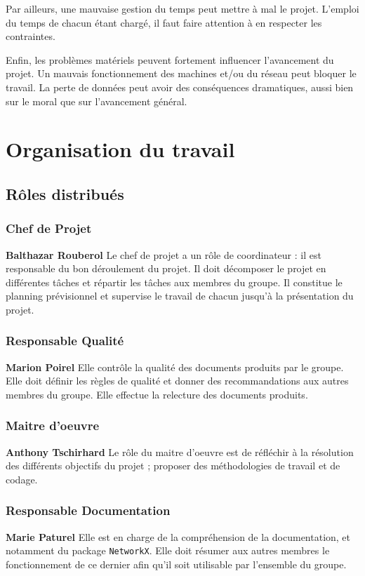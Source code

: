 Par ailleurs, une mauvaise gestion du temps peut mettre à mal le projet. L'emploi du temps de chacun étant chargé, il faut faire attention à en respecter les contraintes.

Enfin, les problèmes matériels peuvent fortement influencer l'avancement du projet. Un mauvais fonctionnement des machines et/ou du réseau peut bloquer le travail. La perte de données peut avoir des conséquences dramatiques, aussi bien sur le moral que sur l'avancement général.

\section{Organisation du travail}
\subsection{Rôles distribués}

\subsubsection{Chef de Projet}
\textbf{Balthazar Rouberol}
Le chef de projet a un rôle de coordinateur : il est responsable du bon déroulement du projet. Il doit décomposer le projet en différentes tâches et répartir les tâches aux membres du groupe. Il constitue le planning prévisionnel et supervise le travail de chacun jusqu'à la présentation du projet.
  
\subsubsection{Responsable Qualité}
\textbf{Marion Poirel}
Elle contrôle la qualité des documents produits par le groupe. Elle doit définir les règles de qualité et donner des recommandations aux autres membres du groupe. Elle effectue la relecture des documents produits.

\subsubsection{Maitre d'oeuvre}
\textbf{Anthony Tschirhard}
Le rôle du maitre d'oeuvre est de réfléchir à la résolution des différents objectifs du projet ; proposer des méthodologies de travail et de codage.

\subsubsection{Responsable Documentation}
\textbf{Marie Paturel}
Elle est en charge de la compréhension de la documentation, et notamment du package \verb?NetworkX?. Elle doit résumer aux autres membres le fonctionnement de ce dernier afin qu'il soit utilisable par l'ensemble du groupe.

